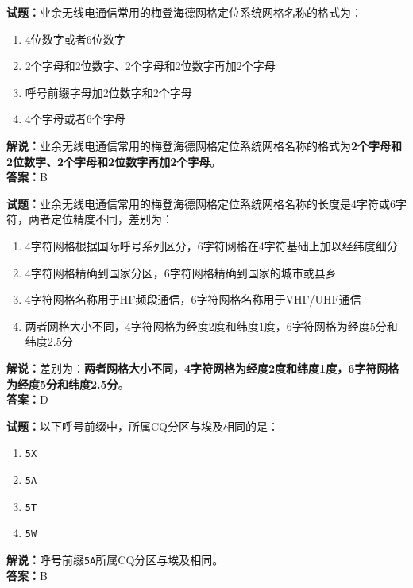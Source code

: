 \documentclass{ctexbook}
\begin{document}
\vspace{1em}

\textbf{试题：}业余无线电通信常用的梅登海德网格定位系统网格名称的格式为：
\begin{enumerate}[leftmargin=3em]
  \item 4位数字或者6位数字
  \item 2个字母和2位数字、2个字母和2位数字再加2个字母
  \item 呼号前缀字母加2位数字和2个字母
  \item 4个字母或者6个字母
\end{enumerate}
\noindent\textbf{解说：}业余无线电通信常用的梅登海德网格定位系统网格名称的格式为\textbf{2个字母和2位数字、2个字母和2位数字再加2个字母}。\\\noindent\textbf{答案：}B

\vspace{1em}

\textbf{试题：}业余无线电通信常用的梅登海德网格定位系统网格名称的长度是4字符或6字符，两者定位精度不同，差别为：
\begin{enumerate}[leftmargin=3em]
  \item 4字符网格根据国际呼号系列区分，6字符网格在4字符基础上加以经纬度细分
  \item 4字符网格精确到国家分区，6字符网格精确到国家的城市或县乡
  \item 4字符网格名称用于HF频段通信，6字符网格名称用于VHF/UHF通信
  \item 两者网格大小不同，4字符网格为经度2度和纬度1度，6字符网格为经度5分和纬度2.5分
\end{enumerate}
\noindent\textbf{解说：}差别为：\textbf{两者网格大小不同，4字符网格为经度2度和纬度1度，6字符网格为经度5分和纬度2.5分}。\\\noindent\textbf{答案：}D

\vspace{1em}

\textbf{试题：}以下呼号前缀中，所属CQ分区与埃及相同的是：
\begin{enumerate}[leftmargin=3em]
  \item \texttt{5X}
  \item \texttt{5A}
  \item \texttt{5T}
  \item \texttt{5W}
\end{enumerate}
\noindent\textbf{解说：}呼号前缀\texttt{5A}所属CQ分区与埃及相同。\\
\noindent\textbf{答案：}B
\end{document}
